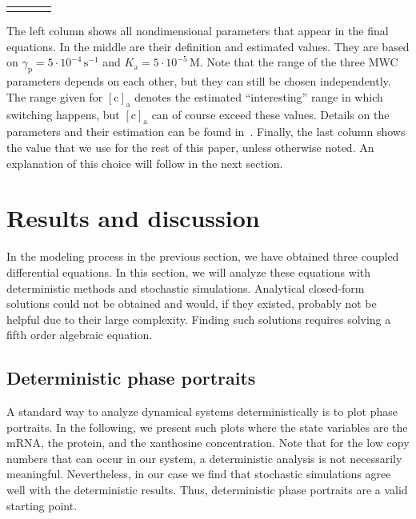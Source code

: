 \documentclass[10pt,letterpaper]{article}
\newlength\savedwidth
\newcommand\thickhline{\noalign{\global\savedwidth\arrayrulewidth\global\arrayrulewidth 2pt}%
	\hline
	\noalign{\global\arrayrulewidth\savedwidth}}
\newcommand{\unit}[1]{\,\mathrm{#1}}
\newcommand{\n}[1]{\mathrm{#1}}
\begin{document}
\begin{table}
\begin{tabular}{rllr}
			\thickhline
		\end{tabular}
		\begin{flushleft} 
			The left column shows all nondimensional parameters that appear in
			the final equations. In the middle are their definition and
			estimated values. They are based on $\gamma_{\n{p}} = 5 \cdot
			10^{-4} \unit{s^{-1}}$ and $K_{\n{a}} = 5 \cdot 10^{-5} \unit{M}$.
			Note that the range of the three MWC parameters depends on each
			other, but they can still be chosen independently. The range given
			for $\n{[c]_{a}}$ denotes the estimated ``interesting'' range in
			which switching happens, but $\n{[c]_{a}}$ can of course exceed
			these values. Details on the parameters and their estimation can be
			found in~. Finally, the last column shows the value
			that we use for the rest of this paper, unless otherwise noted. An
			explanation of this choice will follow in the next section.
		\end{flushleft}
		\label{table1:nondim}
	\end{table}
	
	
	\section*{Results and discussion}
	In the modeling process in the previous section, we have obtained three
	coupled differential equations. In this section, we will analyze these
	equations with deterministic methods and stochastic simulations. Analytical
	closed-form solutions could not be obtained and would, if they existed,
	probably not be helpful due to their large complexity. Finding such
	solutions requires solving a fifth order algebraic equation.
	
	\subsection*{Deterministic phase portraits}
	A standard way to analyze dynamical systems deterministically is
	to plot phase portraits. In the following, we present such plots where the
	state variables are the mRNA, the protein, and the xanthosine concentration. Note that for the low copy numbers that can occur in our system, a deterministic analysis is not necessarily meaningful. Nevertheless, in our case we find that stochastic simulations agree well with the deterministic results. Thus, deterministic phase portraits are a valid starting point.
	
\end{document}
